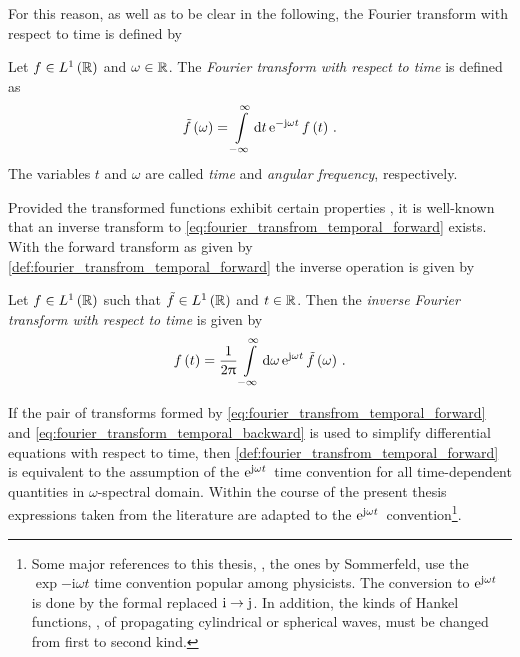 For this reason, as well as to be clear in the following, the Fourier transform
with respect to time is defined by
\begin{definition}
	\label{def:fourier_transfrom_temporal_forward}
	Let $f \in L^1\left( \mathbb{R} \right)$ and $\omega \in \mathbb{R}$.
	The \emph{Fourier transform with respect to time} is defined as 
	\begin{equation}\label{eq:fourier_transfrom_temporal_forward}
		\tilde{f} \left( \omega \right) =
		\int\limits_{-\infty}^{\infty} \mathrm{d} t \,
		\mathrm{e}^{-\mathrm{j} \omega t}\, 
		f\left( t \right) \, .
	\end{equation}
	The variables $t$ and $\omega$ are called \emph{time} and \emph{angular
	frequency}, respectively.
\end{definition}
Provided the transformed functions exhibit certain properties
\cite{heuser2006, strichartz2003}, it is well-known that an inverse
transform to \eqref{eq:fourier_transfrom_temporal_forward} exists.
With the forward transform as given by
\cref{def:fourier_transfrom_temporal_forward} the inverse operation is given by
\begin{lemma}
	Let $f \in L^1 \left(\mathbb{R}\right)$ such that
	$\tilde{f} \in L^1 \left(\mathbb{R}\right)$ and $t \in \mathbb{R}$. Then the
	\emph{inverse Fourier transform with respect to time} is given by
	\begin{equation}\label{eq:fourier_transform_temporal_backward}
		f \left( t \right) =
		\frac{1}{2\uppi}
		\int\limits_{-\infty}^{\infty} \mathrm{d} \omega \,
		\mathrm{e}^{\mathrm{j} \omega t}\, 
		\tilde{f} \left( \omega \right) \, .
	\end{equation}
\end{lemma}

\begin{remark}\label{rem:time_convention}
	If the pair of transforms formed by
	\eqref{eq:fourier_transfrom_temporal_forward} and
	\eqref{eq:fourier_transform_temporal_backward} is used to simplify
	differential equations with respect to time, then
	\cref{def:fourier_transfrom_temporal_forward} is equivalent to the
	assumption of the $\mathrm{e}^{\mathrm{j} \omega t}\,$ time convention for all
	time-dependent quantities in $\omega$-spectral domain.
	Within the course of the present thesis expressions taken from the
	literature are adapted to the $\mathrm{e}^{\mathrm{j} \omega t}\,$ convention\footnote{
		Some major references to this thesis, \eg, the ones by Sommerfeld, 
		use the $\exp{-\mathrm{i} \omega t}$ time convention popular among
		physicists. The conversion to $\mathrm{e}^{\mathrm{j} \omega t}\,$ is done by the
		formal replaced $\mathrm{i} \to \mathrm{j}$. In addition, the kinds of
		Hankel functions, \ie, of propagating cylindrical or spherical waves,
		must be changed from first to second kind.
	}.
\end{remark}

